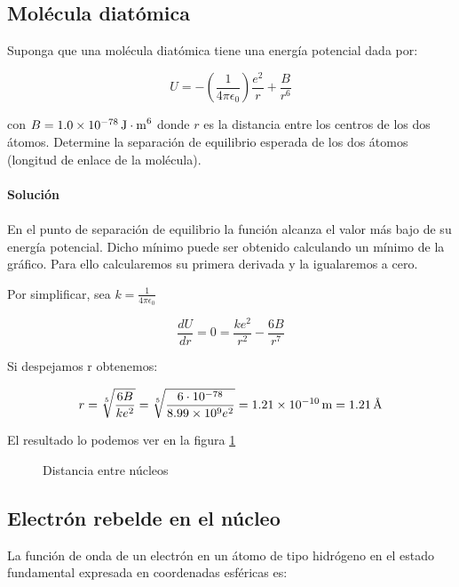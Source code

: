 \documentclass[12pt, a4paper]{article}
\begin{document}
    \subsection{Molécula diatómica}
    Suponga que una molécula diatómica tiene una energía potencial dada por:

    $$U=-\left(\frac{1}{4\pi\epsilon_0}\right)\frac{e^2}{r}+\frac{B}{r^6}$$

    con $B=\SI{1.0d-78}{\J\cdot\meter^6}$ donde $r$ es la distancia entre los centros de los dos átomos.
    Determine la separación de equilibrio esperada de los dos átomos (longitud de enlace de la molécula).

    \paragraph{\textbf{Solución}}
    \paragraph{} En el punto de separación de equilibrio la función alcanza el valor más bajo de su energía
    potencial. Dicho mínimo puede ser obtenido calculando un mínimo de la gráfico. Para ello
    calcularemos su primera derivada y la igualaremos a cero.

    Por simplificar, sea $k = \frac{1}{4\pi \epsilon_0}$

    $$\frac{dU}{dr} = 0 = \frac{k e^2}{r^2}-\frac{6 B}{r^7}$$

    Si despejamos r obtenemos:

    $$r = \sqrt[5]{\frac{6B}{k e^2}} = \sqrt[5]{\frac{6\cdot 10^{-78}}{\num{8.99d9} e^2}} = \SI{1.21d-10}{m} = \SI{1.21}{\angstrom}$$

    El resultado lo podemos ver en la figura \ref{gr:molecula_diatomica}

    \begin{figure}[ht]
      \centering
      \caption{Distancia entre núcleos} \label{gr:molecula_diatomica}
        \fontsize{8}{12}\selectfont
        \resizebox{1\textwidth}{!}{}
    \end{figure}
    \FloatBarrier   %

    \subsection{Electrón rebelde en el núcleo}
    La función de onda de un electrón en un átomo de tipo hidrógeno en el estado fundamental
    expresada en coordenadas esféricas es:
\end{document}
